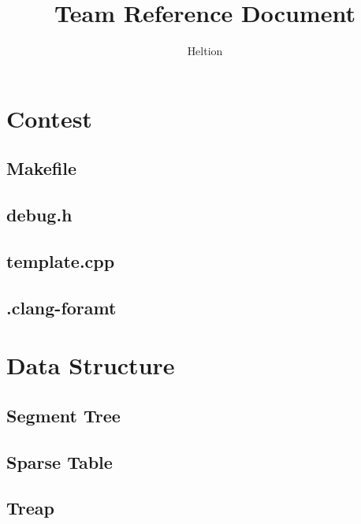 \documentclass{article}
\begin{document}
\title{Team Reference Document}
\author{Heltion}
\maketitle
\newpage
\begin{multicols}{2}
    \tableofcontents
    \newpage
    \setcounter{page}{1}
    \footnotesize

    \section{Contest}

    \subsection{Makefile}
    

    \subsection{debug.h}
    

    \subsection{template.cpp}
    

    \subsection{.clang-foramt}
    

    \section{Data Structure}

    \subsection{Segment Tree}
    

    \subsection{Sparse Table}
    

    \subsection{Treap}
    

\end{multicols}
\end{document}
